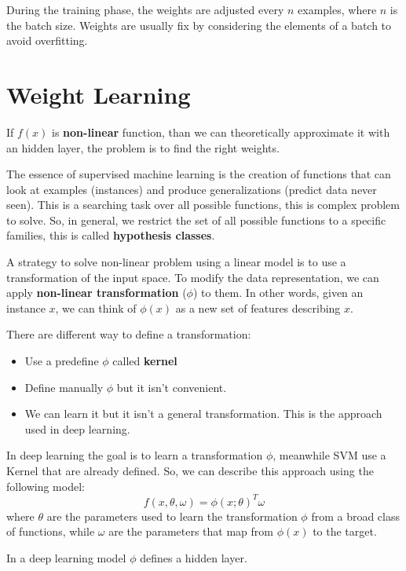 \begin{note}
    During the training phase, the weights are adjusted every $n$ examples,
    where $n$ is the batch size. Weights are usually fix by considering the
    elements of a batch to avoid overfitting.
\end{note}
\section{Weight Learning}
If $f(x)$ is \textbf{non-linear} function, than we can theoretically approximate
it with an hidden layer, the problem is to find the right weights.

The essence of supervised machine learning is the creation of functions that
can look at examples (instances) and produce generalizations (predict data never seen).
This is a searching task over all possible functions, this is complex problem to
solve. So, in general, we restrict the set of all possible functions to a specific
families, this is called \textbf{hypothesis classes}.

A strategy to solve non-linear problem using a linear model is to use a
transformation of the input space. To modify the data representation, we can
apply \textbf{non-linear transformation} ($\phi$) to them. In other words, given
an instance $x$, we can think of $\phi(x)$ as a new set of features describing $x$.

There are different way to define a transformation:
\begin{itemize}
    \item Use a predefine $\phi$ called \textbf{kernel}
    \item Define manually $\phi$ but it isn't convenient.
    \item We can learn it but it isn't a general transformation. This is the
          approach used in deep learning.
\end{itemize}

In deep learning the goal is to learn a transformation $\phi$, meanwhile SVM use
a Kernel that are already defined. So, we can describe this approach using the
following model:
\begin{equation}
    f(x, \theta, \omega) = \phi(x; \theta)^T \omega
\end{equation}
where $\theta$ are the parameters used to learn the transformation $\phi$ from a
broad class of functions, while $\omega$ are the parameters that map from $\phi(x)$
to the target.

\begin{note}
    In a deep learning model $\phi$ defines a hidden layer.
\end{note}

